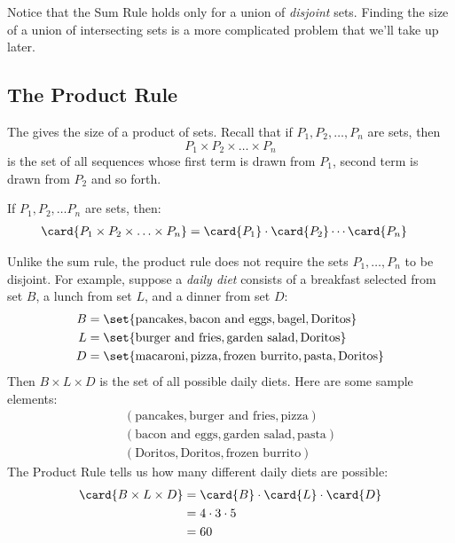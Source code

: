 Notice that the Sum Rule holds only for a union of {\em disjoint}
sets.  Finding the size of a union of intersecting sets is a more
complicated problem that we'll take up later.

\subsection{The Product Rule}

The  gives the size of a product of sets.  Recall that
if $P_1, P_2, \ldots, P_n$ are sets, then
%
\[
P_1 \times P_2 \times \ldots \times P_n
\]
%
is the set of all sequences whose first term is drawn from $P_1$,
second term is drawn from $P_2$ and so forth.

\begin{mathrule}
If $P_1, P_2, \ldots P_n$ are sets, then:
%
\begin{align*}
\card{P_1 \times P_2 \times \ldots \times P_n}
    & = \card{P_1} \cdot \card{P_2} \cdots \card{P_n}
\end{align*}
\end{mathrule}

Unlike the sum rule, the product rule does not require the sets $P_1,
\ldots, P_n$ to be disjoint.  For example, suppose a {\em daily diet}
consists of a breakfast selected from set $B$, a lunch from set $L$,
and a dinner from set $D$:
%
\begin{align*}
B & = \set{\text{pancakes},
      	   \text{bacon and eggs},
           \text{bagel},
           \text{Doritos}} \\
L & = \set{\text{burger and fries},
           \text{garden salad},
           \text{Doritos}} \\
D & = \set{\text{macaroni},
           \text{pizza},
           \text{frozen burrito},
           \text{pasta},
           \text{Doritos}}
\end{align*}
%
Then $B \times L \times D$ is the set of all possible daily diets.
Here are some sample elements:
%
\begin{gather*}
(\text{pancakes}, \text{burger and fries}, \text{pizza}) \\
(\text{bacon and eggs}, \text{garden salad}, \text{pasta}) \\
(\text{Doritos}, \text{Doritos}, \text{frozen burrito})
\end{gather*}
%
The Product Rule tells us how many different daily diets are possible:
%
\begin{align*}
\card{B \times L \times D}
    & = \card{B} \cdot \card{L} \cdot \card{D} \\
    & = 4 \cdot 3 \cdot 5 \\
    & = 60
\end{align*}

